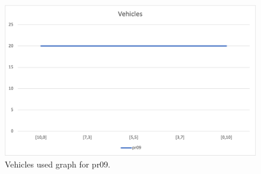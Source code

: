 \begin{figure}[H]
    \centering
    \includegraphics[height=0.25\textheight]{../graphs/pr09-vehicles.png}
    \caption{Vehicles used graph for pr09.}
\end{figure}

\newpage